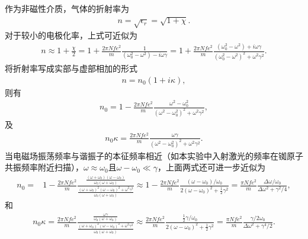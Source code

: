 \documentclass{assignment}
\begin{document}
作为非磁性介质，气体的折射率为
\begin{align}
    n=\sqrt{\epsilon_r}=\sqrt{1+\chi}.
\end{align}
对于较小的电极化率，上式可近似为
\begin{align}
    n\approx 1+\frac{\chi}{2}=1+\frac{2\pi Nfe^2}{m}\frac{1}{(\omega_0^2-\omega^2)-i\omega\gamma}=1+\frac{2\pi Nfe^2}{m}\frac{(\omega_0^2-\omega^2)+i\omega\gamma}{(\omega_0^2-\omega^2)^2+\omega^2\gamma^2}.
\end{align}
将折射率写成实部与虚部相加的形式
\begin{align}
    n=n_0(1+i\kappa),
\end{align}
则有
\begin{align}
    n_0=1-\frac{2\pi Nfe^2}{m}\frac{\omega^2-\omega_0^2}{(\omega^2-\omega_0^2)^2+\omega^2\gamma^2},
\end{align}
及
\begin{align}
    n_0\kappa=\frac{2\pi Nfe^2}{m}\frac{\omega\gamma}{(\omega^2-\omega_0^2)^2+\omega^2\gamma^2}.
\end{align}
当电磁场振荡频率与谐振子的本征频率相近（如本实验中入射激光的频率在铷原子共振频率附近扫描），$\omega\approx\omega_0$且$\omega-\omega_0\ll\gamma$，上面两式还可进一步近似为
\begin{align}
    n_0=&1-\frac{2\pi Nfe^2}{m}\frac{\frac{(\omega+\omega_0)(\omega-\omega_0)}{\omega_0(\omega+\omega_0)}}{\frac{(\omega+\omega_0)^2(\omega-\omega_0)^2+\omega^2\gamma^2}{\omega_0(\omega+\omega_0)}}\approx 1-\frac{2\pi Nfe^2}{m}\frac{(\omega-\omega_0)/\omega_0}{2(\omega-\omega_0)^2+\frac{1}{2}\gamma^2}=\frac{\pi Nfe^2}{m}\frac{\Delta\omega/\omega_0}{\Delta\omega^2+\gamma^2/4},
\end{align}
和
\begin{align}
    n_0\kappa=\frac{2\pi Nfe^2}{m}\frac{\frac{\omega\gamma}{\omega_0(\omega+\omega_0)}}{\frac{(\omega+\omega_0)^2(\omega-\omega_0)^2+\omega^2\gamma^2}{\omega_0(\omega+\omega_0)}}\approx\frac{2\pi Nfe^2}{m}\frac{\frac{1}{2}\gamma/\omega_0}{2(\omega-\omega_0)^2+\frac{1}{2}\gamma^2}=\frac{\pi Nfe^2}{m}\frac{\gamma/2\omega_0}{\Delta\omega^2+\gamma^4/2}.
\end{align}
\end{document}

